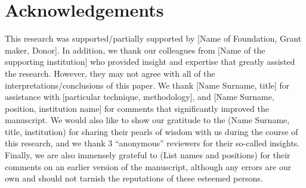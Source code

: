 \section*{Acknowledgements} \label{sec:acknowledgements}

This research was supported/partially supported by [Name of Foundation, Grant maker, Donor]. In addition, we thank our colleagues from [Name of the supporting institution] who provided insight and expertise that greatly assisted the research. However, they may not agree with all of the interpretations/conclusions of this paper.
We thank [Name Surname, title] for assistance with [particular technique, methodology], and [Name Surname, position, institution name] for comments that significantly improved the manuscript.
We would also like to show our gratitude to the (Name Surname, title, institution) for sharing their pearls of wisdom with us during the course of this research, and we thank 3 “anonymous” reviewers for their so-called insights. Finally, we are also immensely grateful to (List names and positions) for their comments on an earlier version of the manuscript, although any errors are our own and should not tarnish the reputations of these esteemed persons.